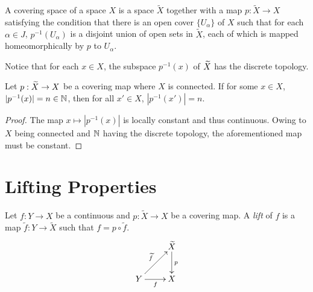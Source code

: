 \begin{definition}
    A covering space of a space $X$ is a space $\widetilde X$ together with a map $p:\widetilde X\to X$ satisfying the condition that there is an open cover $\{U_\alpha\}$ of $X$ such that for each $\alpha\in J$, $p^{-1}(U_\alpha)$ is a disjoint union of open sets in $\widetilde X$, each of which is mapped homeomorphically by $p$ to $U_\alpha$.
\end{definition}

Notice that for each $x\in X$, the subspace $p^{-1}(x)$ of $\widetilde{X}$ has the discrete topology. 

\begin{proposition}
    Let $p:\widetilde{X}\to X$ be a covering map where $X$ is connected. If for some $x\in X$, $|p^{-1}(x)| = n\in\mathbb{N}$, then for all $x'\in X$, $|p^{-1}(x')| = n$.
\end{proposition}
\begin{proof}
    The map $x\mapsto|p^{-1}(x)|$ is locally constant and thus continuous. Owing to $X$ being connected and $\mathbb{N}$ having the discrete topology, the aforementioned map must be constant.
\end{proof}

\section{Lifting Properties}

\begin{definition}[Lift]
    Let $f: Y\to X$ be a continuous and $p:\widetilde X\to X$ be a covering map. A \textit{lift} of $f$ is a map $\widetilde f: Y\to\widetilde X$ such that $f = p\circ\widetilde f$. 
    \begin{equation*}
        \xymatrix{
            & {\widetilde X}\ar[d]^p\\
            Y\ar[r]_f\ar[ru]^{\widetilde f} & X
        }
    \end{equation*}
\end{definition}

